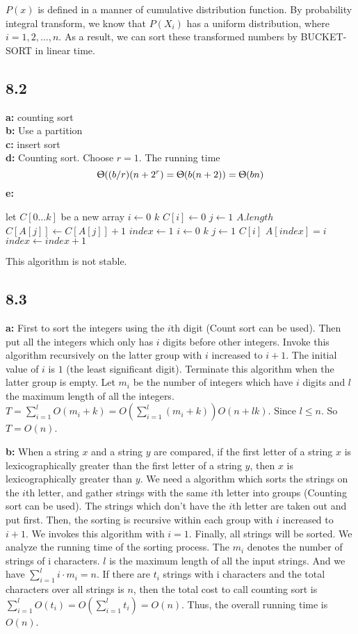 \documentclass{book}
\begin{document}
\begin{CJK}{UTF8}{gkai}
$P(x)$ is defined in a manner of cumulative distribution function. By 
probability integral transform, we know that $P(X_i)$ has a uniform 
distribution, where $i = 1, 2, \ldots, n$. As a result, we can sort these 
transformed numbers by BUCKET-SORT in linear time.

\subsection*{8.2}
\textbf{a:} counting sort \\
\textbf{b:} Use a partition \\
\textbf{c:} insert sort \\
\textbf{d:} Counting sort. Choose $r=1$. The running time 
$$\Uptheta((b/r)(n+2^r) = \Uptheta(b(n+2)) = \Uptheta(bn)$$
\textbf{e:}

\begin{codebox}
\li let $C[0\dots k]$ be a new array
\li \For $i \gets 0$ \To $k$
\li \Do $C[i] \gets 0$
\End
\li \For $j \gets 1$ \To $A.length$
\li \Do $C[A[j]] \gets C[A[j]] + 1$
\End
\li $index \gets 1$
\li \For $i \gets 0$ \To $k$
\li \Do \For $j \gets 1$ \To $C[i]$
\li \Do $A[index] = i$
\li $index \gets index + 1$
\End
\End
\End
\end{codebox}
This algorithm is not stable.

\subsection*{8.3}
\textbf{a:} First to sort the integers using the $i$th digit (Count sort can be 
used). Then put all the integers which only has $i$ digits before other 
integers. Invoke this algorithm recursively on the latter group with $i$ 
increased to $i+1$. The initial value of $i$ is $1$ (the least significant 
digit).  Terminate this algorithm when the latter group is empty. Let $m_i$ be 
the number of integers which have $i$ digits and $l$ the maximum length of all 
the integers.  $T=\sum_{i=1}^{l}O(m_i+k) = O(\sum_{i=1}^l (m_i+k)) O(n+lk)$.  
Since $l \le n$. So $T=O(n)$.

\textbf{b:} When a string $x$ and a string $y$ are compared, if the first letter 
of a string $x$ is lexicographically greater than the first letter of a string 
$y$, then $x$ is lexicographically greater than $y$. We need a algorithm which 
sorts the strings on the $i$th letter, and gather strings with the same $i$th 
letter into groups (Counting sort can be used). The strings which don't have the 
$i$th letter are taken out and put first. Then, the sorting is recursive within 
each group with $i$ increased to $i+1$. We invokes this algorithm with $i = 1$.  
Finally, all strings will be sorted.
We analyze the running time of the sorting process. The $m_i$ denotes the number 
of strings of i characters. $l$ is the maximum length of all the input strings.  
And we have $\sum_{i = 1}^l i \cdot m_i = n$. If there are $t_i$ strings with i 
characters and the total characters over all strings is $n$, then the total cost 
to call counting sort is $\sum_{i=1}^l O(t_i) = O(\sum_{i=1}^l t_i) = O(n)$.  
Thus, the overall running time is $O(n)$.  


\end{CJK}
\end{document}
